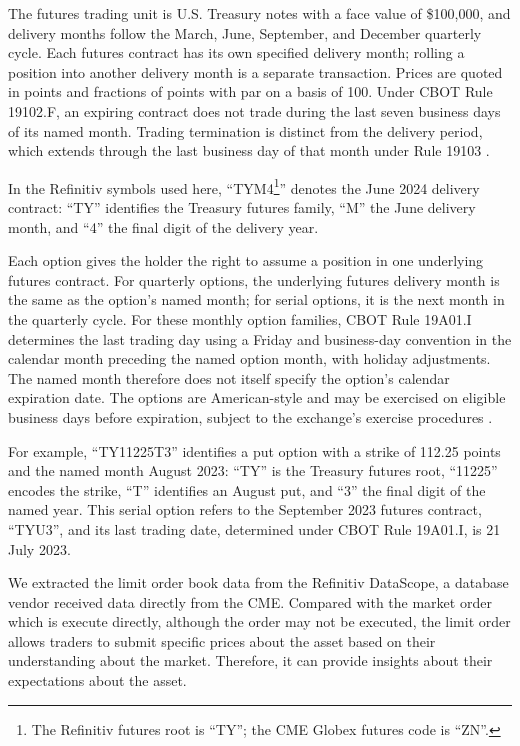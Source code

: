 The futures trading unit is U.S. Treasury notes with a face value of \$100,000, and delivery months follow the March, June, September, and December quarterly cycle. Each futures contract has its own specified delivery month; rolling a position into another delivery month is a separate transaction. Prices are quoted in points and fractions of points with par on a basis of 100. Under CBOT Rule 19102.F, an expiring contract does not trade during the last seven business days of its named month. Trading termination is distinct from the delivery period, which extends through the last business day of that month under Rule 19103 \citep{cme_tnote_futures_rules}.


In the Refinitiv symbols used here, ``TYM4\footnote{The Refinitiv futures root is ``TY''; the CME Globex futures code is ``ZN''.}'' denotes the June 2024 delivery contract: ``TY'' identifies the Treasury futures family, ``M'' the June delivery month, and ``4'' the final digit of the delivery year.


Each option gives the holder the right to assume a position in one underlying futures contract. For quarterly options, the underlying futures delivery month is the same as the option's named month; for serial options, it is the next month in the quarterly cycle. For these monthly option families, CBOT Rule 19A01.I determines the last trading day using a Friday and business-day convention in the calendar month preceding the named option month, with holiday adjustments. The named month therefore does not itself specify the option's calendar expiration date. The options are American-style and may be exercised on eligible business days before expiration, subject to the exchange's exercise procedures \citep{cme_tnote_options_rules}.

For example, ``TY11225T3'' identifies a put option with a strike of 112.25 points and the named month August 2023: ``TY'' is the Treasury futures root, ``11225'' encodes the strike, ``T'' identifies an August put, and ``3'' the final digit of the named year. This serial option refers to the September 2023 futures contract, ``TYU3'', and its last trading date, determined under CBOT Rule 19A01.I, is 21 July 2023.

We extracted the limit order book data from the Refinitiv DataScope, a database vendor received data directly from the CME. Compared with the market order which is execute directly, although the order may not be executed, the limit order allows traders to submit specific prices about the asset based on their understanding about the market. Therefore, it can provide insights about their expectations about the asset.

